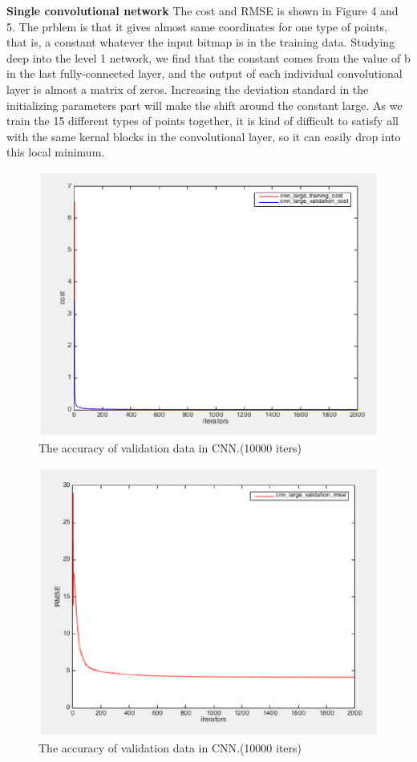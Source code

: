 \documentclass[10pt,twocolumn,letterpaper]{article}
\begin{document}
\textbf{Single convolutional network} The cost and RMSE is shown in Figure 4 and 5. The prblem is that it gives almost same coordinates for one type of points, that is, a constant whatever the input bitmap is in the training data. Studying deep into the level 1 network, we find that the constant comes from the value of b in the last fully-connected layer, and the output of each individual convolutional layer is almost a matrix of zeros. Increasing the deviation standard in the initializing parameters part will make the shift around the constant large. As we train the 15 different types of points together, it is kind of difficult to satisfy all with the same kernal blocks in the convolutional layer, so it can easily drop into this local minimum. \\
%
\begin{figure}[htbp]
\centering
\includegraphics[width=0.8\linewidth]{cnn_large_cost.eps}
\caption{The accuracy of validation data in CNN.(10000 iters)}
\label{fig:long}
\label{fig:onecol}
\end{figure}

\begin{figure}[htbp]
\centering
\includegraphics[width=0.8\linewidth]{cnn_large_rmse.eps}
\caption{The accuracy of validation data in CNN.(10000 iters)}
\label{fig:long}
\label{fig:onecol}
\end{figure}
\end{document}
